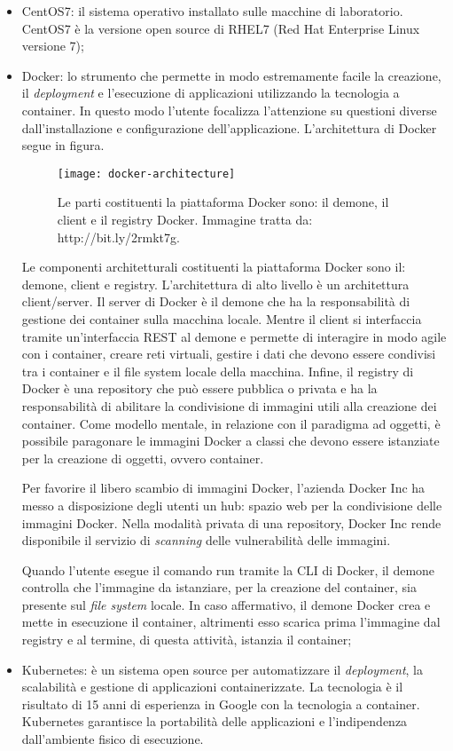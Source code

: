 \begin{itemize}
	\item CentOS7: il sistema operativo installato sulle macchine di 
laboratorio. CentOS7 è la versione open source di RHEL7 (Red Hat Enterprise 
Linux versione 7);
	\item Docker: lo strumento che permette in modo estremamente facile la 
creazione, il \textit{deployment} e l'esecuzione di applicazioni utilizzando la 
tecnologia a container. In questo modo l'utente focalizza l'attenzione su 
questioni diverse dall'installazione e configurazione dell'applicazione. 
	L'architettura di Docker segue in figura. 
	
	\begin{figure}[htbp]
		\begin{center}
			\texttt{[image: docker-architecture]}
			\caption{Le parti costituenti la piattaforma Docker 
sono: il demone, il client e il registry Docker. Immagine tratta da: 
http://bit.ly/2rmkt7g.}
		\end{center}
	\end{figure}
	
	Le componenti architetturali costituenti la piattaforma Docker sono il:
	demone, client e registry. L'architettura di alto livello è 
	un architettura client/server. Il server di Docker è il demone che ha 
la responsabilità di gestione dei container sulla macchina locale. Mentre il 
client si interfaccia tramite un'interfaccia REST al demone e permette di 
interagire in modo agile con i container, creare reti virtuali, gestire i dati 
che devono essere condivisi tra i container e il file system locale della 
macchina. Infine, il registry di Docker è una repository che può essere 
pubblica o privata e ha la responsabilità di abilitare la condivisione di 
immagini utili alla creazione dei container. Come modello mentale, in relazione 
con il paradigma ad oggetti, è possibile paragonare le immagini Docker a classi 
che devono essere istanziate per la creazione di oggetti, ovvero container. 
	
	Per favorire il libero scambio di immagini Docker, l'azienda Docker Inc 
ha 
	messo a disposizione degli utenti un hub: spazio web per la 
condivisione delle immagini Docker. Nella modalità privata di una repository, 
Docker Inc rende disponibile 
	il servizio di \textit{scanning} delle vulnerabilità delle immagini. 
	
	Quando l'utente esegue il comando run tramite la CLI di Docker, il 
demone controlla che l'immagine da istanziare, per la creazione del container, 
sia presente sul \textit{file system} locale. In caso affermativo, il demone 
Docker crea e mette in esecuzione il container, altrimenti esso scarica prima 
l'immagine dal registry e al termine, di questa attività, istanzia il container;
	\item Kubernetes: è un sistema open source per automatizzare il 
\textit{deployment}, la scalabilità e gestione di applicazioni containerizzate. 
La tecnologia è il 
	risultato di 15 anni di esperienza in Google con la tecnologia a 
container. 
	Kubernetes garantisce la portabilità delle applicazioni e 
l'indipendenza dall'ambiente fisico di esecuzione.
	

\end{itemize}
